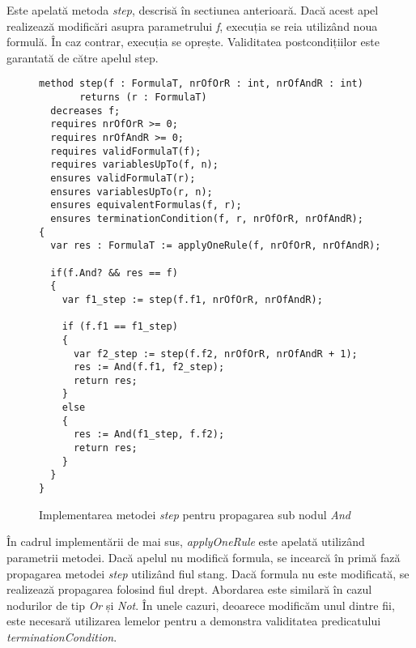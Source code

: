 Este apelată metoda \textit{step}, descrisă în sectiunea anterioară. Dacă acest apel realizează modificări asupra parametrului \textit{f}, execuția se reia utilizând noua formulă. În caz contrar, execuția se oprește. Validitatea postcondițiilor este garantată de către apelul step.

\begin{figure}[H]
    \caption{Implementarea metodei \textit{step} pentru propagarea sub nodul \textit{And}}
    

\begin{Verbatim}[fontsize=\small, frame=single,baselinestretch=0.1]
method step(f : FormulaT, nrOfOrR : int, nrOfAndR : int) 
       returns (r : FormulaT)
  decreases f;
  requires nrOfOrR >= 0;
  requires nrOfAndR >= 0;
  requires validFormulaT(f);
  requires variablesUpTo(f, n);
  ensures validFormulaT(r);
  ensures variablesUpTo(r, n);
  ensures equivalentFormulas(f, r);
  ensures terminationCondition(f, r, nrOfOrR, nrOfAndR);
{
  var res : FormulaT := applyOneRule(f, nrOfOrR, nrOfAndR);

  if(f.And? && res == f)
  {
    var f1_step := step(f.f1, nrOfOrR, nrOfAndR);
            
    if (f.f1 == f1_step)
    {
      var f2_step := step(f.f2, nrOfOrR, nrOfAndR + 1);
      res := And(f.f1, f2_step);
      return res;
    }
    else
    {
      res := And(f1_step, f.f2);
      return res;
    }
  }
}

\end{Verbatim}
\end{figure}

În cadrul implementării de mai sus, \textit{applyOneRule} este apelată utilizând parametrii metodei. Dacă apelul nu modifică formula, se incearcă în primă fază propagarea metodei \textit{step} utilizând fiul stang. Dacă formula nu este modificată, se realizează propagarea folosind fiul drept. Abordarea este similară în cazul nodurilor de tip \textit{Or} și \textit{Not}.
În unele cazuri, deoarece modificăm unul dintre fii, este necesară utilizarea lemelor pentru a demonstra validitatea predicatului \textit{terminationCondition}.

